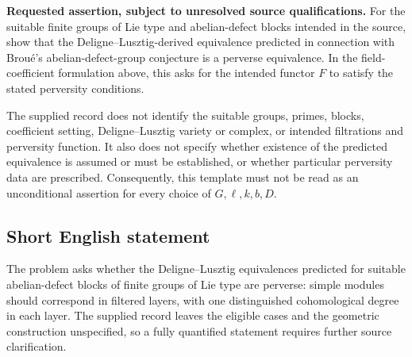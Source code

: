 \documentclass[11pt]{article}
\begin{document}
\textbf{Requested assertion, subject to unresolved source qualifications.} For the suitable finite groups of Lie type and abelian-defect blocks intended in the source, show that the Deligne--Lusztig-derived equivalence predicted in connection with Brou\'e's abelian-defect-group conjecture is a perverse equivalence. In the field-coefficient formulation above, this asks for the intended functor \(F\) to satisfy the stated perversity conditions.

The supplied record does not identify the suitable groups, primes, blocks, coefficient setting, Deligne--Lusztig variety or complex, or intended filtrations and perversity function. It also does not specify whether existence of the predicted equivalence is assumed or must be established, or whether particular perversity data are prescribed. Consequently, this template must not be read as an unconditional assertion for every choice of \(G,\ell,k,b,D\).
\subsection{Short English statement}
The problem asks whether the Deligne--Lusztig equivalences predicted for suitable abelian-defect blocks of finite groups of Lie type are perverse: simple modules should correspond in filtered layers, with one distinguished cohomological degree in each layer. The supplied record leaves the eligible cases and the geometric construction unspecified, so a fully quantified statement requires further source clarification.
\end{document}
